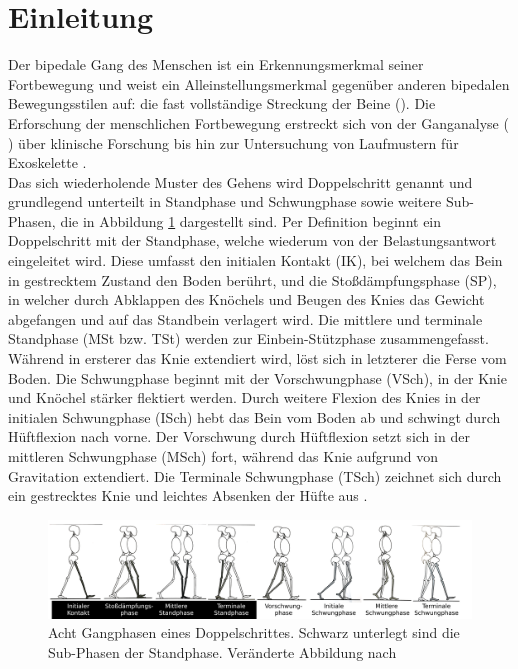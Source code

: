 \section{Einleitung}
Der bipedale Gang des Menschen ist ein Erkennungsmerkmal seiner Fortbewegung und weist ein Alleinstellungsmerkmal gegenüber anderen bipedalen Bewegungsstilen auf: die fast vollständige Streckung der Beine (\cite{alexander1992simple}). Die Erforschung der menschlichen Fortbewegung erstreckt sich von der Ganganalyse (\cite{alexander1992simple} \cite{perry2010gait}) über klinische Forschung \autocite{wren2011efficacy} bis hin zur Untersuchung von Laufmustern für Exoskelette \autocite{barbareschi2015statically}.\\
Das sich wiederholende Muster des Gehens wird Doppelschritt genannt und grundlegend unterteilt in Standphase und Schwungphase sowie weitere Sub-Phasen, die in Abbildung \ref{fig:Skizze_Phasen} dargestellt sind. Per Definition beginnt ein Doppelschritt mit der Standphase, welche wiederum von der Belastungsantwort eingeleitet wird. Diese umfasst den initialen Kontakt (IK), bei welchem das Bein in gestrecktem Zustand den Boden berührt, und die Stoßdämpfungsphase (SP), in welcher durch Abklappen des Knöchels und Beugen des Knies das Gewicht abgefangen und auf das Standbein verlagert wird. Die mittlere und terminale Standphase (MSt bzw. TSt) werden zur Einbein-Stützphase zusammengefasst. Während in ersterer das Knie extendiert wird, löst sich in letzterer die Ferse vom Boden. Die Schwungphase beginnt mit der Vorschwungphase (VSch), in der Knie und Knöchel stärker flektiert werden. Durch weitere Flexion des Knies in der initialen Schwungphase (ISch) hebt das Bein vom Boden ab und schwingt durch Hüftflexion nach vorne. Der Vorschwung durch Hüftflexion setzt sich in der mittleren Schwungphase (MSch) fort, während das Knie aufgrund von Gravitation extendiert. Die Terminale Schwungphase (TSch) zeichnet sich durch ein gestrecktes Knie und leichtes Absenken der Hüfte aus \autocite{perry2010gait}.\\
\begin{figure}[h!]
	\centering
	\includegraphics[width=\linewidth]{bilder/Einleitung/Skizze_Gangphasen_small}
	\caption[Gangphasen]{Acht Gangphasen eines Doppelschrittes. Schwarz unterlegt sind die Sub-Phasen der Standphase. Veränderte Abbildung nach \autocite{perry2010gait}}
	\label{fig:Skizze_Phasen}
\end{figure}
